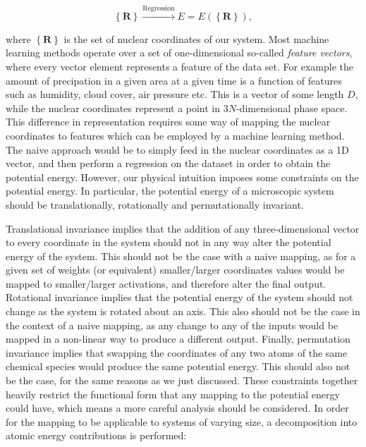 \begin{equation}
 \left\{ \bm{R} \right\} \overset{\text{Regression}}{\longrightarrow}
    E = E\left( \left\{ \bm{R} \right\}\right) , 
\end{equation}

where $\left\{\bm{R}\right\}$ is the set of nuclear coordinates of our system.
Most machine learning methods operate over a set of one-dimensional
so-called \textit{feature vectors}, where every vector element
represents a feature of the data set. For example the amount
of precipation in a given area at a given time is a function
of features such as humidity, cloud cover, air pressure etc.
This is a vector of some length $D$, while the nuclear coordinates
represent a point in $3N$-dimensional phase space.
This difference in representation requires some way of mapping
the nuclear coordinates to features which can be employed
by a machine learning method.
The naive approach would be to simply feed in the nuclear coordinates
as a 1D vector, and then perform a regression on the dataset
in order to obtain the potential energy. However, our physical intuition
imposes some constraints on the potential energy.
In particular, the potential energy of a microscopic system should
be translationally, rotationally and permutationally invariant.
\par
Translational invariance implies that the addition of any
three-dimensional vector to every coordinate in the system should
not in any way alter the potential energy of the system.
This should not be the case with a naive mapping, as for a given
set of weights (or equivalent) smaller/larger coordinates
values would be mapped to smaller/larger activations, and therefore
alter the final output.
Rotational invariance implies that the potential energy
of the system should not change as the system is rotated
about an axis. This also should not be the case in the context
of a naive mapping, as any change to any of the inputs
would be mapped in a non-linear way to produce a different output.
Finally, permutation invariance implies that swapping the coordinates
of any two atoms of the same chemical species would produce the
same potential energy. This should also not be the case, for
the same reasons as we just discussed.
These constraints together heavily restrict the functional form
that any mapping to the potential energy could have,
which means a more careful analysis should be considered.
\newline
\newline
In order for the mapping to be applicable to systems of varying size,
a decomposition into atomic energy contributions is performed:

